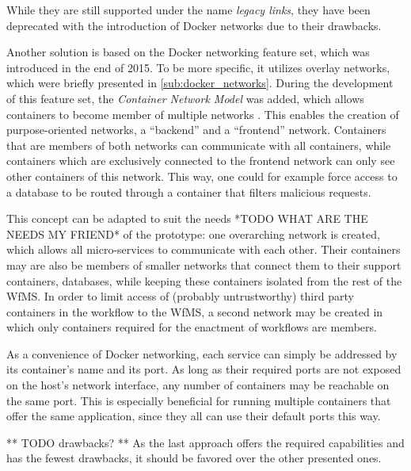   While they are still supported under the name \emph{legacy links}, they have been deprecated with the introduction of Docker networks due to their drawbacks.

  Another solution is based on the Docker networking feature set, which was introduced in the end of 2015.
  To be more specific, it utilizes overlay networks, which were briefly presented in \ref{sub:docker_networks}. During the development of this feature set, the \emph{Container Network Model} was added, which allows containers to become member of multiple networks \cite{Tucker2015Docker}.
  This enables the creation of purpose-oriented networks, \eg a ``backend'' and a ``frontend'' network. Containers that are members of both networks can communicate with all containers, while containers which are exclusively connected to the frontend network can only see other containers of this network. This way, one could for example force access to a database to be routed through a container that filters malicious requests.

  This concept can be adapted to suit the needs *TODO WHAT ARE THE NEEDS MY FRIEND* of the prototype: one overarching network is created, which allows all micro-services to communicate with each other. Their containers may are also be members of smaller networks that connect them to their support containers, \eg databases, while keeping these containers isolated from the rest of the \ac{WfMS}. In order to limit access of (probably untrustworthy) third party containers in the workflow to the \ac{WfMS}, a second network may be created in which only containers required for the enactment of workflows are members.

  As a convenience of Docker networking, each service can simply be addressed by its container's name and its port. As long as their required ports are not exposed on the host's network interface, any number of containers may be reachable on the same port. This is especially beneficial for running multiple containers that offer the same application, since they all can use their default ports this way.

  ** TODO drawbacks? **
  As the last approach offers the required capabilities and has the fewest drawbacks, it should be favored over the other presented ones.
